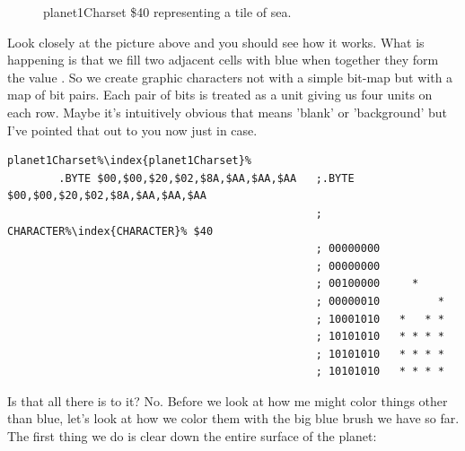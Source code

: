 \begin{figure}[H]
{\begin{adjustbox}{width=4cm,center}
\begin{tikzpicture}
      \end{tikzpicture}
    \end{adjustbox}
  }\caption{planet1Charset \$40 representing a tile of sea.}
\end{figure}

Look closely at the picture above and you should see how it works. What is happening is that we fill
two adjacent cells with blue when together they form the value . So
we create graphic characters not with a simple bit-map but with a map of bit pairs. Each pair of bits is treated as a
unit giving us four units on each row. Maybe it's intuitively obvious that 
means 'blank' or 'background' but I've pointed that out to you now just in case.

\lstset{style=6502Style}
\begin{lstlisting}[escapechar=\%,caption=Character \icode{\$40} representing the sea as it is defined in the source code. A full eight bytes are required
to define each character\index{character}\, so not cheap.,basicstyle=\tiny]
planet1Charset%\index{planet1Charset}%
        .BYTE $00,$00,$20,$02,$8A,$AA,$AA,$AA   ;.BYTE $00,$00,$20,$02,$8A,$AA,$AA,$AA
                                                ; CHARACTER%\index{CHARACTER}% $40
                                                ; 00000000           
                                                ; 00000000           
                                                ; 00100000     *     
                                                ; 00000010         * 
                                                ; 10001010   *   * * 
                                                ; 10101010   * * * * 
                                                ; 10101010   * * * * 
                                                ; 10101010   * * * * 
\end{lstlisting}

Is that all there is to it? No. Before we look at how me might color things other than blue, let's look at how we color them
with the big blue brush we have so far. The first thing we do is clear down the entire surface of the planet:

